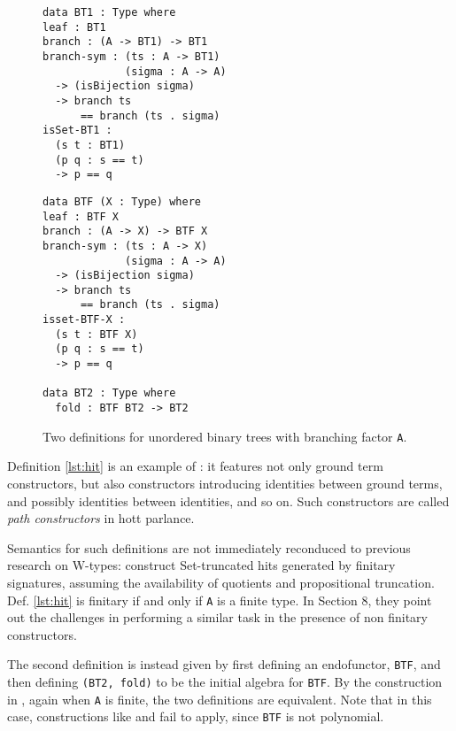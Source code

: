 \documentclass[a4paper]{article}
\begin{document}
\bgroup
\renewcommand{\lstlistingname}{Definition}
\begin{figure}
	\caption{Two definitions for unordered binary trees with branching factor \texttt{A}.}
	\label{fig:trdefs}
	\centering
	\begin{minipage}{.45\textwidth}
		\begin{lstlisting}[caption={\gls{hit} based},label={lst:hit}]
data BT1 : Type where
leaf : BT1
branch : (A -> BT1) -> BT1
branch-sym : (ts : A -> BT1)
             (sigma : A -> A)
  -> (isBijection sigma)
  -> branch ts 
      == branch (ts . sigma)
isSet-BT1 :
  (s t : BT1)
  (p q : s == t)
  -> p == q
\end{lstlisting}
	\end{minipage}
	\qquad
	\begin{minipage}{.45\textwidth}
		\begin{lstlisting}[caption={Initial algebra based},label={lst:fix}]
data BTF (X : Type) where
leaf : BTF X
branch : (A -> X) -> BTF X
branch-sym : (ts : A -> X)
             (sigma : A -> A)
  -> (isBijection sigma)
  -> branch ts 
      == branch (ts . sigma)
isset-BTF-X :
  (s t : BTF X)
  (p q : s == t)
  -> p == q

data BT2 : Type where
  fold : BTF BT2 -> BT2
\end{lstlisting}
	\end{minipage}
\end{figure}
\egroup

Definition \ref{lst:hit} is an example of : it features not only ground term constructors, but also constructors introducing identities between ground terms, and possibly identities between identities, and so on. Such constructors are called \textit{path constructors} in \gls{hott} parlance.

Semantics for such definitions are not immediately reconduced to previous research on W-types: \textcite{Weide2019} construct Set-truncated \glspl{hit} generated by finitary signatures, assuming the availability of quotients and propositional truncation. Def. \ref{lst:hit} is finitary if and only if \texttt{A} is a finite type. In Section 8, they point out the challenges in performing a similar task in the presence of non finitary constructors.

The second definition is instead given by first defining an endofunctor, \texttt{BTF}, and then defining \texttt{(BT2, fold)} to be the initial algebra for \texttt{BTF}. By the construction in \cite{Weide2019}, again when \texttt{A} is finite, the two definitions are equivalent. Note that in this case, constructions like \cite{Moerdijk2000} and \cite{Pitts2021} fail to apply, since \texttt{BTF} is not polynomial.
\end{document}
